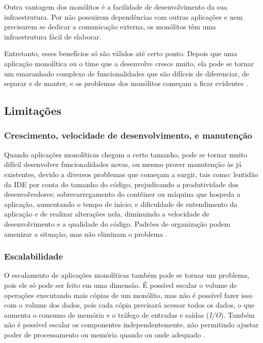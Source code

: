 Outra vantagem dos monólitos é a facilidade de desenvolvimento da sua infraestrutura. Por não possuirem dependências com outras aplicações e nem precisarem se dedicar a comunicação externa, os monólitos têm uma infraestrutura fácil de elaborar.

Entretanto, esses benefícios só são válidos até certo ponto. Depois que uma aplicação monolítica ou o time que a desenvolve cresce muito, ela pode se tornar um emaranhado complexo de funcionalidades que são difíceis de diferenciar, de separar e de manter, e os problemas dos monólitos começam a ficar evidentes \cite{microservicesIO_monolithic_architecture}.

\subsection{Limitações}\label{subsection-monolitos-limitacoes}

\subsubsection{Crescimento, velocidade de desenvolvimento, e manutenção}
Quando aplicações monolíticas chegam a certo tamanho, pode se tornar muito difícil desenvolver funcionalidades novas, ou mesmo prover manutenção às já existentes, devido a diversos problemas que começam a surgir, tais como: lentidão da IDE por conta do tamanho do código, prejudicando a produtividade dos desenvolvedores; sobrecarregamento do contêiner ou máquina que hospeda a aplicação, aumentando o tempo de início; e dificuldade de entendimento da aplicação e de realizar alterações nela, diminuindo a velocidade de desenvolvimento e a qualidade do código. Padrões de organização podem amenizar a situação, mas não eliminam o problema \cite{microservicesIO_monolithic_architecture}.

\subsubsection{Escalabilidade}
O escalamento de aplicações monolíticas também pode se tornar um problema, pois ele só pode ser feito em uma dimensão. É possível escalar o volume de operações executando mais cópias de um monólito, mas não é possível fazer isso com o volume dos dados, pois cada cópia precisará acessar todos os dados, o que aumenta o consumo de memória e o tráfego de entradas e saídas (\emph{I/O}). Também não é possível escalar os componentes independentemente, não permitindo ajustar poder de processamento ou memória quando ou onde adequado \cite{microservicesIO_monolithic_architecture}.


